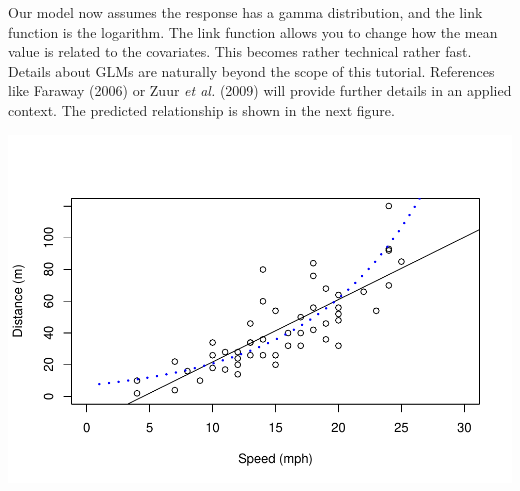 \documentclass[
]{article}
\newenvironment{Shaded}{\begin{snugshade}}{\end{snugshade}}
\newcommand{\AttributeTok}[1]{\textcolor[rgb]{0.13,0.29,0.53}{#1}}
\newcommand{\CommentTok}[1]{\textcolor[rgb]{0.56,0.35,0.01}{\textit{#1}}}
\newcommand{\DecValTok}[1]{\textcolor[rgb]{0.00,0.00,0.81}{#1}}
\newcommand{\FunctionTok}[1]{\textcolor[rgb]{0.13,0.29,0.53}{\textbf{#1}}}
\newcommand{\NormalTok}[1]{#1}
\newcommand{\SpecialCharTok}[1]{\textcolor[rgb]{0.81,0.36,0.00}{\textbf{#1}}}
\newcommand{\StringTok}[1]{\textcolor[rgb]{0.31,0.60,0.02}{#1}}
\begin{document}
Our model now assumes the response has a gamma distribution, and the
link function is the logarithm. The link function allows you to change
how the mean value is related to the covariates. This becomes rather
technical rather fast. Details about GLMs are naturally beyond the scope
of this tutorial. References like Faraway (2006) or Zuur \emph{et al.}
(2009) will provide further details in an applied context. The predicted
relationship is shown in the next figure.

\begin{Shaded}
\end{Shaded}

\includegraphics{TAMsIntro2RviaRStudioTutorial_files/figure-latex/unnamed-chunk-62-1.pdf}
\end{document}
